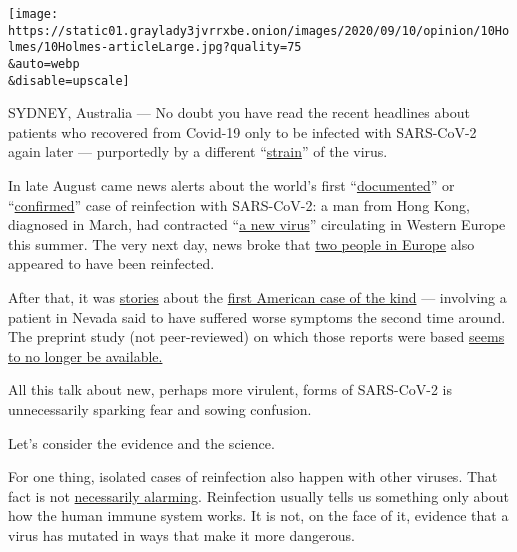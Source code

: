 \texttt{[image: https://static01.graylady3jvrrxbe.onion/images/2020/09/10/opinion/10Holmes/10Holmes-articleLarge.jpg?quality=75\\\&auto=webp\\\&disable=upscale]}

SYDNEY, Australia --- No doubt you have read the recent headlines about
patients who recovered from Covid-19 only to be infected with SARS-CoV-2
again later --- purportedly by a different
``\href{https://www.sciencedaily.com/releases/2020/08/200803105246.htm}{strain}''
of the virus.

In late August came news alerts about the world's first
``\href{https://www.nytimes3xbfgragh.onion/2020/08/24/health/coronavirus-reinfection.html}{documented}''
or
``\href{https://www.physiciansweekly.com/worlds-first-confirmed-case-of-covid-19-reinfection-reported-in-hong-kong/}{confirmed}''
case of reinfection with SARS-CoV-2: a man from Hong Kong, diagnosed in
March, had contracted
``\href{https://www.infectioncontroltoday.com/view/covid-19-reinfection-first-instance-recorded-in-hong-kong}{a
new virus}'' circulating in Western Europe this summer. The very next
day, news broke that
\href{https://www.nytimes3xbfgragh.onion/2020/08/25/world/covid-19-coronavirus.html\#link-f61c099}{two
people in Europe} also appeared to have been reinfected.

After that, it was
\href{https://www.nbcnews.com/health/health-news/covid-19-reinfection-reported-nevada-patient-researchers-say-n1238679}{stories}
about the
\href{https://www.foxnews.com/health/first-coronavirus-reinfection-case-us-nevada}{first
American case of the kind} --- involving a patient in Nevada said to
have suffered worse symptoms the second time around. The preprint study
(not peer-reviewed) on which those reports were based
\href{https://papers.ssrn.com/sol3/papers.cfm?abstract_id=3681489}{seems
to no longer be available.}

All this talk about new, perhaps more virulent, forms of SARS-CoV-2 is
unnecessarily sparking fear and sowing confusion.

Let's consider the evidence and the science.

For one thing, isolated cases of reinfection also happen with other
viruses. That fact is not
\href{https://www.nytimes3xbfgragh.onion/2020/07/31/opinion/coronavirus-antibodies-immunity.html?searchResultPosition=3}{necessarily
alarming}. Reinfection usually tells us something only about how the
human immune system works. It is not, on the face of it, evidence that a
virus has mutated in ways that make it more dangerous.

